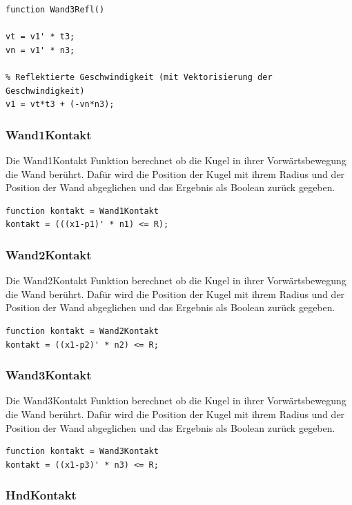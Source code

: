 \documentclass[]{scrartcl}
\begin{document}
\begin{lstlisting}
function Wand3Refl()

vt = v1' * t3;
vn = v1' * n3;

% Reflektierte Geschwindigkeit (mit Vektorisierung der Geschwindigkeit)
v1 = vt*t3 + (-vn*n3); 
\end{lstlisting}

\subsubsection{Wand1Kontakt}

Die Wand1Kontakt Funktion berechnet ob die Kugel in ihrer Vorwärtsbewegung die Wand berührt. Dafür wird die Position der Kugel mit ihrem Radius und der Position der Wand abgeglichen und das Ergebnis als Boolean zurück gegeben.

\begin{lstlisting}
function kontakt = Wand1Kontakt
kontakt = (((x1-p1)' * n1) <= R);
\end{lstlisting}

\subsubsection{Wand2Kontakt}

Die Wand2Kontakt Funktion berechnet ob die Kugel in ihrer Vorwärtsbewegung die Wand berührt. Dafür wird die Position der Kugel mit ihrem Radius und der Position der Wand abgeglichen und das Ergebnis als Boolean zurück gegeben.

\begin{lstlisting}
function kontakt = Wand2Kontakt
kontakt = ((x1-p2)' * n2) <= R;
\end{lstlisting}

\subsubsection{Wand3Kontakt}

Die Wand3Kontakt Funktion berechnet ob die Kugel in ihrer Vorwärtsbewegung die Wand berührt. Dafür wird die Position der Kugel mit ihrem Radius und der Position der Wand abgeglichen und das Ergebnis als Boolean zurück gegeben.

\begin{lstlisting}
function kontakt = Wand3Kontakt
kontakt = ((x1-p3)' * n3) <= R;
\end{lstlisting}

\subsubsection{HndKontakt}
\end{document}
